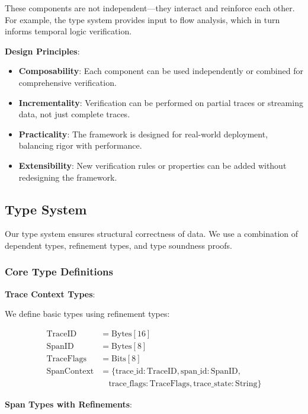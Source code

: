These components are not independent---they interact and reinforce each other. For example, the type system provides input to flow analysis, which in turn informs temporal logic verification.

\textbf{Design Principles}:

\begin{itemize}
\item \textbf{Composability}: Each component can be used independently or combined for comprehensive verification.
\item \textbf{Incrementality}: Verification can be performed on partial traces or streaming data, not just complete traces.
\item \textbf{Practicality}: The framework is designed for real-world deployment, balancing rigor with performance.
\item \textbf{Extensibility}: New verification rules or properties can be added without redesigning the framework.
\end{itemize}

\subsection{Type System}
\label{sec:type-system}

Our type system ensures structural correctness of \otlp data. We use a combination of dependent types, refinement types, and type soundness proofs.

\subsubsection{Core Type Definitions}

\textbf{Trace Context Types}:

We define basic \otlp types using refinement types:

\begin{align*}
\text{TraceID} &= \text{Bytes}[16] \\
\text{SpanID} &= \text{Bytes}[8] \\
\text{TraceFlags} &= \text{Bits}[8] \\
\text{SpanContext} &= \{ \text{trace\_id}: \text{TraceID}, \text{span\_id}: \text{SpanID}, \\
                   &\quad \text{trace\_flags}: \text{TraceFlags}, \text{trace\_state}: \text{String} \}
\end{align*}

\textbf{Span Types with Refinements}:

